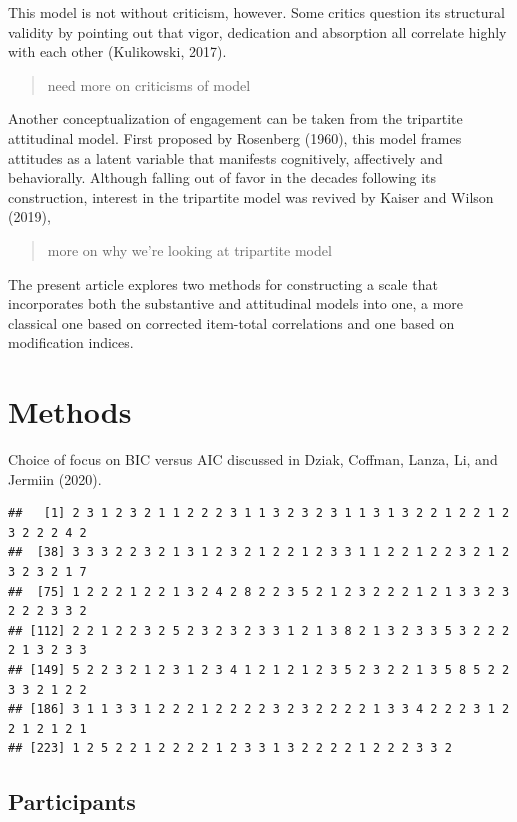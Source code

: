 \documentclass[
  english,
  man]{apa6}
\begin{document}
This model is not without criticism, however. Some critics question its structural validity by pointing out that vigor, dedication and absorption all correlate highly with each other (Kulikowski, 2017).

\begin{quote}
need more on criticisms of model
\end{quote}

Another conceptualization of engagement can be taken from the tripartite attitudinal model. First proposed by Rosenberg (1960), this model frames attitudes as a latent variable that manifests cognitively, affectively and behaviorally. Although falling out of favor in the decades following its construction, interest in the tripartite model was revived by Kaiser and Wilson (2019),

\begin{quote}
more on why we're looking at tripartite model
\end{quote}

The present article explores two methods for constructing a scale that incorporates both the substantive and attitudinal models into one, a more classical one based on corrected item-total correlations and one based on modification indices.

\hypertarget{methods}{%
\section{Methods}\label{methods}}

Choice of focus on BIC versus AIC discussed in Dziak, Coffman, Lanza, Li, and Jermiin (2020).

\begin{verbatim}
##   [1] 2 3 1 2 3 2 1 1 2 2 2 3 1 1 3 2 3 2 3 1 1 3 1 3 2 2 1 2 2 1 2 3 2 2 2 4 2
##  [38] 3 3 3 2 2 3 2 1 3 1 2 3 2 1 2 2 1 2 3 3 1 1 2 2 1 2 2 3 2 1 2 3 2 3 2 1 7
##  [75] 1 2 2 2 1 2 2 1 3 2 4 2 8 2 2 3 5 2 1 2 3 2 2 2 1 2 1 3 3 2 3 2 2 2 3 3 2
## [112] 2 2 1 2 2 3 2 5 2 3 2 3 2 3 3 1 2 1 3 8 2 1 3 2 3 3 5 3 2 2 2 2 1 3 2 3 3
## [149] 5 2 2 3 2 1 2 3 1 2 3 4 1 2 1 2 1 2 3 5 2 3 2 2 1 3 5 8 5 2 2 3 3 2 1 2 2
## [186] 3 1 1 3 3 1 2 2 2 1 2 2 2 2 3 2 3 2 2 2 2 1 3 3 4 2 2 2 3 1 2 2 1 2 1 2 1
## [223] 1 2 5 2 2 1 2 2 2 2 1 2 3 3 1 3 2 2 2 2 1 2 2 2 3 3 2
\end{verbatim}

\hypertarget{participants}{%
\subsection{Participants}\label{participants}}
\end{document}
